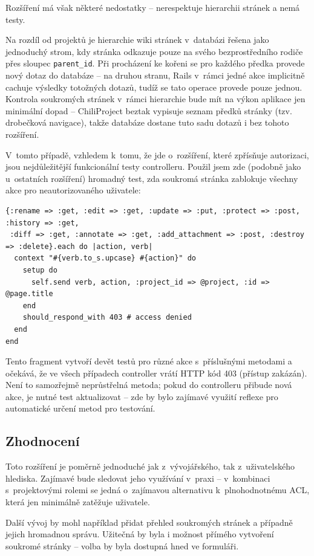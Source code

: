\documentclass[thesis=B,czech]{FITthesis}[2012/05/02]
\begin{document}
Rozšíření má však některé nedostatky -- nerespektuje hierarchii stránek
a nemá testy.

Na rozdíl od projektů je hierarchie wiki stránek v~databázi řešena jako
jednoduchý strom, kdy stránka odkazuje pouze na svého bezprostředního
rodiče přes sloupec \lstinline!parent_id!. Při procházení ke kořeni se
pro každého předka provede nový dotaz do databáze -- na druhou stranu,
Rails v~rámci jedné akce implicitně cachuje výsledky totožných dotazů,
tudíž se tato operace provede pouze jednou. Kontrola soukromých stránek
v~rámci hierarchie bude mít na výkon aplikace jen minimální dopad --
ChiliProject beztak vypisuje seznam předků stránky (tzv. drobečková
navigace), takže databáze dostane tuto sadu dotazů i bez tohoto
rozšíření.

V~tomto případě, vzhledem k~tomu, že jde o~rozšíření, které zpřísňuje
autorizaci, jsou nejdůležitější funkcionální testy controlleru. Použil
jsem zde (podobně jako u~ostatních rozšíření) hromadný test, zda soukromá
stránka zablokuje všechny akce pro neautorizovaného uživatele:

\begin{lstlisting}
{:rename => :get, :edit => :get, :update => :put, :protect => :post, :history => :get,
 :diff => :get, :annotate => :get, :add_attachment => :post, :destroy => :delete}.each do |action, verb|
  context "#{verb.to_s.upcase} #{action}" do
    setup do
      self.send verb, action, :project_id => @project, :id => @page.title
    end
    should_respond_with 403 # access denied
  end
end
\end{lstlisting}
Tento fragment vytvoří devět testů pro různé akce s~příslušnými metodami
a očekává, že ve všech případech controller vrátí HTTP kód 403
(přístup zakázán). Není to samozřejmě neprůstřelná metoda; pokud do
controlleru přibude nová akce, je nutné test aktualizovat -- zde by bylo
zajímavé využití reflexe pro automatické určení metod pro testování.

\subsection{Zhodnocení}

Toto rozšíření je poměrně jednoduché jak z~vývojářského, tak
z~uživatelského hlediska. Zajímavé bude sledovat jeho využívání
v~praxi -- v~kombinaci s~projektovými rolemi se jedná
o~zajímavou alternativu k~plnohodnotnému \gls{ACL}, která jen minimálně
zatěžuje uživatele.

Další vývoj by mohl například přidat přehled soukromých stránek a
případně jejich hromadnou správu. Užitečná by byla i možnost přímého vytvoření
soukromé stránky -- volba by byla dostupná hned ve formuláři.
\end{document}
